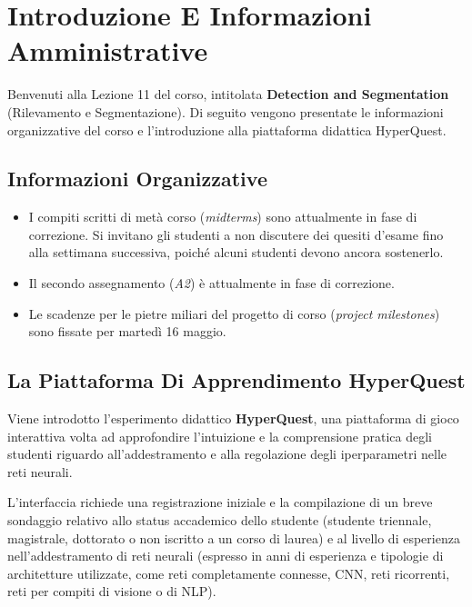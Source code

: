 ﻿\documentclass[11pt, a4paper]{article}
\begin{document}
\section{Introduzione E Informazioni Amministrative}

Benvenuti alla Lezione 11 del corso, intitolata \textbf{Detection and Segmentation} (Rilevamento e Segmentazione). Di seguito vengono presentate le informazioni organizzative del corso e l'introduzione alla piattaforma didattica HyperQuest.

\subsection{Informazioni Organizzative}

\begin{itemize}
    \item I compiti scritti di metà corso (\emph{midterms}) sono attualmente in fase di correzione. Si invitano gli studenti a non discutere dei quesiti d'esame fino alla settimana successiva, poiché alcuni studenti devono ancora sostenerlo.
    \item Il secondo assegnamento (\emph{A2}) è attualmente in fase di correzione.
    \item Le scadenze per le pietre miliari del progetto di corso (\emph{project milestones}) sono fissate per martedì 16 maggio.
\end{itemize}

\subsection{La Piattaforma Di Apprendimento HyperQuest}

Viene introdotto l'esperimento didattico \textbf{HyperQuest}, una piattaforma di gioco interattiva volta ad approfondire l'intuizione e la comprensione pratica degli studenti riguardo all'addestramento e alla regolazione degli iperparametri nelle reti neurali.



L'interfaccia richiede una registrazione iniziale e la compilazione di un breve sondaggio relativo allo status accademico dello studente (studente triennale, magistrale, dottorato o non iscritto a un corso di laurea) e al livello di esperienza nell'addestramento di reti neurali (espresso in anni di esperienza e tipologie di architetture utilizzate, come reti completamente connesse, CNN, reti ricorrenti, reti per compiti di visione o di NLP).
\end{document}
